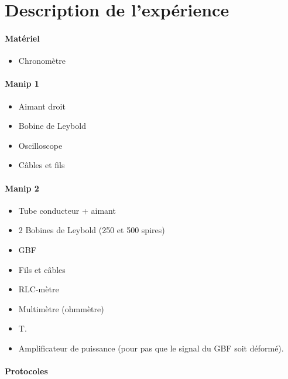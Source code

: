 \documentclass[11pt]{report}
\numberwithin{figure}{section}
\numberwithin{equation}{section}
\numberwithin{table}{section}
\newcommand{\1}{\boldsymbol{1}}
\begin{document}
\section*{Description de l'expérience}



\begin{tcolorbox}[breakable, enhanced, colback=red!2!white,colframe=mycolor!85!black,title=\textbf{\textbf{Expérience}}]
\paragraph*{Matériel}
\begin{itemize}
\item Chronomètre
\end{itemize}
\paragraph{Manip 1}
\begin{itemize}
\item Aimant droit
\item Bobine de Leybold 
\item Oscilloscope
\item Câbles et fils
\end{itemize}
\paragraph{Manip 2}
\begin{itemize}
\item Tube conducteur + aimant
\end{itemize}
\begin{itemize}
\item 2 Bobines de Leybold (250 et 500 spires)
\item GBF
\item Fils et câbles
\item RLC-mètre
\item Multimètre (ohmmètre)
\item T.
\item Amplificateur de puissance (pour pas que le signal du GBF soit déformé).
\end{itemize}

\paragraph*{Protocoles}


\end{tcolorbox}
\end{document}

